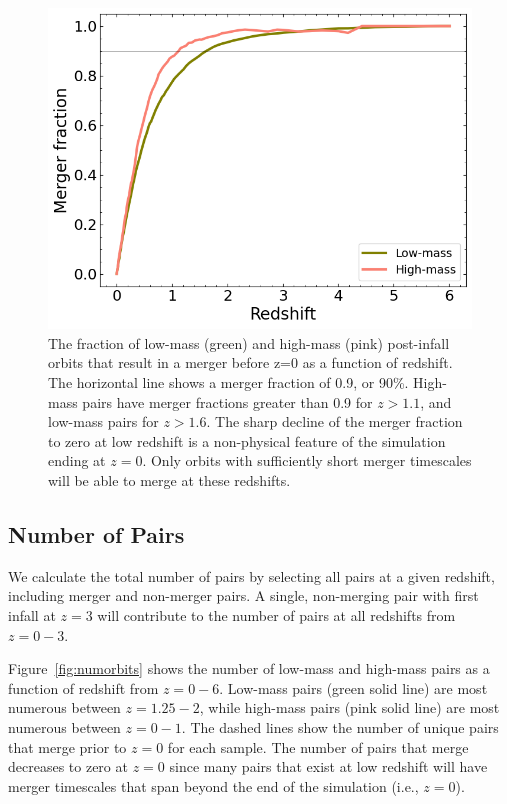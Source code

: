 \documentclass[twocolumn,linenumbers]{aastex631}
\begin{document}
\begin{figure}[htb]
    \begin{center}
    \includegraphics[width=\columnwidth]{plots/bet-on-it/6_mergerfraction.png}
    \caption{The fraction of low-mass (green) and high-mass (pink) post-infall orbits that result in a merger before z=0 as a function of redshift. 
    The horizontal line shows a merger fraction of 0.9, or 90\%. 
    High-mass pairs have merger fractions greater than 0.9 for $z>1.1$, and low-mass pairs for $z>1.6$.
    The sharp decline of the merger fraction to zero at low redshift is a non-physical feature of the simulation ending at $z=0$.
    Only orbits with sufficiently short merger timescales will be able to merge at these redshifts.}
    \label{fig:fmerge}
    \end{center}
\end{figure}

\subsection{Number of Pairs}\label{sec:pairprops-num}
We calculate the total number of pairs by selecting all pairs at a given redshift, including merger and non-merger pairs.
A single, non-merging pair with first infall at $z=3$ will contribute to the number of pairs at all redshifts from $z=0-3$. 

Figure~\ref{fig:numorbits} shows the number of low-mass and high-mass pairs as a function of redshift from $z=0-6$. 
Low-mass pairs (green solid line) are most numerous between $z=1.25-2$, while high-mass pairs (pink solid line) are most numerous between $z=0-1$.
The dashed lines show the number of unique pairs that merge prior to $z=0$ for each sample. 
The number of pairs that merge decreases to zero at $z=0$ since many pairs that exist at low redshift will have merger timescales that span beyond the end of the simulation (i.e., $z=0$). 
\end{document}
